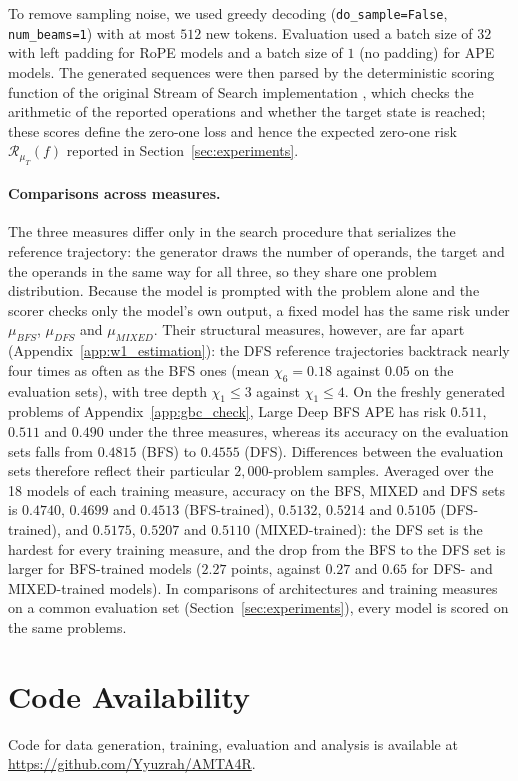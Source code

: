 To remove sampling noise, we used greedy decoding (\texttt{do\_sample=False}, \texttt{num\_beams=1}) with at most $512$ new tokens. Evaluation used a batch size of $32$ with left padding for RoPE models and a batch size of $1$ (no padding) for APE models. %
 The generated sequences were then parsed by the deterministic scoring function of the original Stream of Search implementation \citep{gandhi2024streamsearchsoslearning}, which checks the arithmetic of the reported operations and whether the target state is reached; %
 these scores define the zero-one loss and hence the expected zero-one risk $\mathcal{R}_{\mu_T}(f)$ reported in Section~\ref{sec:experiments}.

\paragraph{Comparisons across measures.}\label{app:eval_scope}
The three measures differ only in the search procedure that serializes the reference trajectory: the generator draws the number of operands, the target and the operands in the same way for all three, so they share one problem distribution. Because the model is prompted with the problem alone and the scorer checks only the model's own output, a fixed model has the same risk under $\mu_{BFS}$, $\mu_{DFS}$ and $\mu_{MIXED}$. Their structural measures, however, are far apart (Appendix~\ref{app:w1_estimation}): the DFS reference trajectories backtrack nearly four times as often as the BFS ones (mean $\chi_6=0.18$ against $0.05$ on the evaluation sets), with tree depth $\chi_1\le 3$ against $\chi_1\le 4$. On the freshly generated problems of Appendix~\ref{app:gbc_check}, Large Deep BFS APE has risk $0.511$, $0.511$ and $0.490$ under the three measures, whereas its accuracy on the evaluation sets falls from $0.4815$ (BFS) to $0.4555$ (DFS). Differences between the evaluation sets therefore reflect their particular $2{,}000$-problem samples. Averaged over the 18 models of each training measure, accuracy on the BFS, MIXED and DFS sets is $0.4740$, $0.4699$ and $0.4513$ (BFS-trained), $0.5132$, $0.5214$ and $0.5105$ (DFS-trained), and $0.5175$, $0.5207$ and $0.5110$ (MIXED-trained): the DFS set is the hardest for every training measure, and the drop from the BFS to the DFS set is larger for BFS-trained models ($2.27$ points, against $0.27$ and $0.65$ for DFS- and MIXED-trained models). In comparisons of architectures and training measures on a common evaluation set (Section~\ref{sec:experiments}), every model is scored on the same problems.

\section{Code Availability}
\label{app:code}
Code for data generation, training, evaluation and analysis is available at \url{https://github.com/Yyuzrah/AMTA4R}. %



